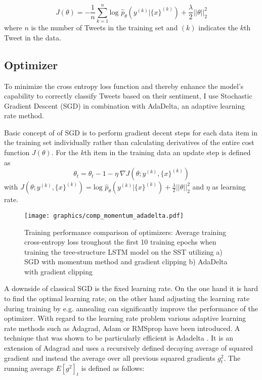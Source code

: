 \documentclass[a4paper,12pt]{article}%
\begin{document}
$$
J(\theta) = - \frac{1}{n} \sum_{k=1}^n \text{log } \hat{p}_{\theta} \left(y^{(k)} | \{x\}^{(k)} \right) + \frac{\lambda}{2} \vert \vert \theta \vert \vert^2_2
$$
where $n$ is the number of Tweets in the training set and $(k)$ indicates the $k$th Tweet in the data.


\subsection{Optimizer}
To minimize the cross entropy loss function and thereby enhance the model's capability to correctly classify Tweets based on their sentiment, I use Stochastic Gradient Descent (SGD) in combination with AdaDelta, an adaptive learning rate method.

Basic concept of of SGD is to perform gradient decent steps for each data item in the training set individually rather than calculating derivatives of the entire cost function $J(\theta)$. For the $k$th item in the training data an update step is defined as
$$
\theta_t = \theta_t-1 - \eta ~ \nabla J(\theta; y^{(k)}, \{x\}^{(k)})
$$
with $J(\theta; y^{(k)}, \{x\}^{(k)}) = \text{log } \hat{p}_{\theta} \left(y^{(k)} | \{x\}^{(k)} \right) + \frac{\lambda}{2} \vert \vert \theta \vert \vert^2_2$ and $\eta$ as learning rate.

\begin{figure}
\captionsetup{justification=centering}
\centering
\texttt{[image: graphics/comp\_momentum\_adadelta.pdf]}
\caption[Training Performance of Different Optimizers]{Training performance comparison of optimizers: Average training cross-entropy loss troughout the first 10 training epochs when training the tree-structure LSTM model on the SST utilizing a) SGD with momentum method and gradient clipping b) AdaDelta with gradient clipping\label{fig:comp_momentum_adadelta}}
\end{figure}

A downside of classical SGD is the fixed learning rate. On the one hand it is hard to find the optimal learning rate, on the other hand adjusting the learning rate during training by e.g. annealing can significantly improve the performance of the optimizer. With regard to the learning rate problem various adaptive learning rate methods such as Adagrad, Adam or RMSprop have been introduced. A technique that was shown to be particularly efficient is Adadelta \citep{Zeiler2012}. It is an extension of Adagrad and uses a recursively defined decaying average of squared gradient and instead the average over all previous squared gradients $g_t^2$. The running average $E[g^2]_t$ is defined as follows:
\end{document}
